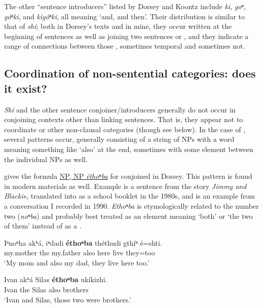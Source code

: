 \documentclass[output=paper]{LSP/langsci}
\begin{document}
The other ``sentence introducers'' listed by Dorsey and Koontz include \textit{ki}, \textit{goⁿ}, \textit{góⁿki}, and \textit{kigóⁿki}, all meaning `and, and then'. Their distribution is similar to that of \textit{shi}; both in Dorsey's texts and in mine, they occur written at the beginning of sentences as well as joining two sentences or , and they indicate a range of connections between those , sometimes temporal and sometimes not. 

\subsection{Coordination of non-sentential categories: does it exist?}

\textit{Shi} and the other sentence conjoiner/introducers generally do not occur in conjoining contexts other than linking sentences. That is, they appear not to coordinate  or other non-clausal categories (though see  below).  In the case of , several patterns occur, generally consisting of a string of NPs with a word meaning something like `also' at the end, sometimes with some element between the individual NPs as well.  

\citet[201]{Koontz1984} gives the formula \underline{NP, NP \textit{éthoⁿba}} for conjoined  in Dorsey.  This pattern is found in modern materials as well.  Example  is a sentence from the story \textit{Jimmy and Blackie}, translated into  as a school booklet in the 1980s, and  is an example from a conversation I recorded in 1990. \textit{Ethoⁿba} is etymologically related to the number two (\textit{noⁿba}) and probably best treated as an element meaning `both' or `the two of them' instead of as a .

\begin{exe}
\ex\label{ex:rudin:12} 
\gll  Iⁿnoⁿha  	akʰá, iⁿdadi    \textbf{éthoⁿba} 	théthudi 	gthíⁿ 	é=shti.  \\
	my.mother 	the  	my.father 	also        	here       	live   	they=too\\
\trans `My mom and also my dad, they live here too.'

\ex\label{ex:rudin:13} 
\gll  Ivan 	akʰá Silas 	\textbf{éthoⁿba} ukíkizhi. \\         
Ivan the   Silas	 also       	brothers\\
\trans`Ivan and Silas, those two were brothers.'
\end{exe}
\end{document}
